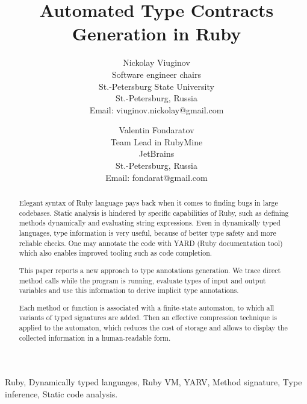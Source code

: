 \documentclass[conference]{IEEEtran}
\begin{document}
\title{Automated Type Contracts Generation in Ruby}
\author
{
    \IEEEauthorblockN
    {
        Nickolay Viuginov 
    }
    
    \IEEEauthorblockA
    {
        Software engineer chairs\\
        St.-Petersburg State University\\
        St.-Petersburg, Russia\\
        Email: viuginov.nickolay@gmail.com
    }
    \and
    \IEEEauthorblockN
    {
        Valentin Fondaratov 
    }
    
    \IEEEauthorblockA
    {
        Team Lead in RubyMine\\
        JetBrains\\
        St.-Petersburg, Russia\\
        Email: fondarat@gmail.com
    }

}
\maketitle

\begin{abstract}
Elegant syntax of Ruby language pays back when it comes to finding bugs in large codebases. Static analysis is
  hindered\cite{ruby_type_checker} by specific capabilities of Ruby, such as defining methods dynamically and evaluating
  string expressions.  Even in dynamically typed languages, type information is very useful, because of better type
  safety and more reliable checks.  One may annotate the code with YARD (Ruby documentation tool) which also enables
  improved tooling such as code completion.

This paper reports a new approach to type annotations generation. We trace direct method calls while the program is
  running, evaluate types of input and output variables and use this information to derive implicit type annotations.

Each method or function is associated with a finite-state automaton, to which all variants of typed signatures are
  added. Then an effective compression technique is applied to the automaton, which reduces the cost of storage and
  allows to display the collected information in a human-readable form.
 
\end{abstract}

\begin{IEEEkeywords}
Ruby, Dynamically typed languages, Ruby VM, YARV, Method signature, Type inference, Static code analysis.
\end{IEEEkeywords}
\IEEEpeerreviewmaketitle
\end{document}
